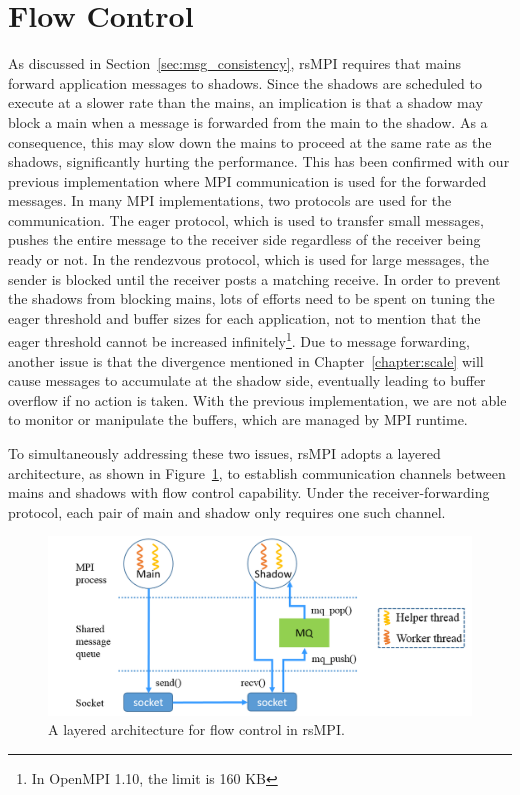 \section{Flow Control}
As discussed in Section~\ref{sec:msg_consistency}, rsMPI requires that mains forward application messages to shadows. Since the shadows are scheduled to execute at a slower rate than the mains, an implication is that a shadow may block a main when a message is forwarded from the main to the shadow. As a consequence, this may slow down the mains to proceed at the same rate as the shadows, significantly hurting the performance. 
This has been confirmed with our previous implementation where MPI communication is used for the forwarded messages. In many MPI implementations, two protocols are used for the communication. The eager protocol, which is used to transfer small messages, pushes the entire message to the receiver side regardless of the receiver being ready or not. In the rendezvous protocol, which is used for large messages, the sender is blocked until the receiver posts a matching receive. In order to prevent the shadows from blocking mains, lots of efforts need to be spent on tuning the eager threshold and buffer sizes for each application, not to mention that the eager threshold cannot be increased infinitely\footnote{In OpenMPI 1.10, the limit is 160 KB}. 
Due to message forwarding, another issue is that the divergence mentioned in Chapter~\ref{chapter:scale} will cause messages to accumulate at the shadow side, eventually leading to buffer overflow if no action is taken. With the previous implementation, we are not able to monitor or manipulate the buffers, which are managed by MPI runtime.

To simultaneously addressing these two issues, rsMPI adopts a layered architecture, as shown in Figure~\ref{fig:flow_control}, to establish communication channels between mains and shadows with flow control capability. Under the receiver-forwarding protocol, each pair of main and shadow only requires one such channel. 

\begin{figure}[!t]
  \begin{center}
      \includegraphics[width=\columnwidth]{Figures/flow_control}
  \end{center}
  \caption{A layered architecture for flow control in rsMPI.}
  \label{fig:flow_control}
\end{figure}

